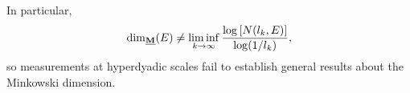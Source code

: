\begin{example}
	In particular,
	\[ \operatorname{\dim_{\underline{\mathbf{M}}}}(E) \neq \liminf_{k \to \infty} \frac{\log \left[ N(l_k,E) \right]}{\log(1/l_k)}, \] %
	so measurements at hyperdyadic scales fail to establish general results about the Minkowski dimension.



\end{example}
